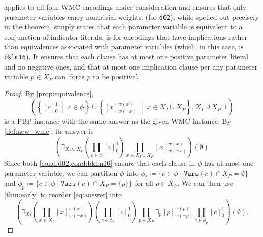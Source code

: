 \documentclass[runningheads]{llncs}
\begin{document}
 applies to all four WMC encodings under consideration and
ensures that only parameter variables carry nontrivial weights. 
(for \texttt{d02}), while spelled out precisely in the theorem, simply states
that each parameter variable is equivalent to a conjunction of indicator
literals.  is for encodings that have implications rather than
equivalences associated with parameter variables (which, in this case, is
\texttt{bklm16}). It ensures that each clause has at most one positive
parameter literal and no negative ones, and that at most one implication clause
per any parameter variable $p \in X_P$ can `force $p$ to be positive'.

\begin{proof}
  By \cref{prop:equivalence},
  \begin{equation}
    \left(\left\{[c]_0^1 \;\middle|\; c \in \phi\right\} \cup \left\{[x]_{w(\neg
          x)}^{w(x)} \;\middle|\; x \in X_I \cup X_P\right\}, X_I \cup X_P,
      1\right) \label{eq:new_wmc2}
  \end{equation}
  is a PBP instance with the same answer as the given WMC instance. By
  \cref{def:new_wmc}, its answer is
  \begin{equation} \label{eq:answer}
    \left(\exists_{X_I \cup X_P} \left( \prod_{c \in \phi} [c]_0^1 \right) \prod_{x \in X_I \cup X_P} [x]_{w(\neg x)}^{w(x)} \right)(\emptyset)
  \end{equation}
  Since both \cref{cond:d02,cond:bklm16} ensure that each clause in
  $\phi$ has at most one parameter variable, we can partition $\phi$ into
  $\phi_* \coloneqq \{c \in \phi \mid \mathtt{Vars}(c) \cap X_P = \emptyset \}$
  and $\phi_p \coloneqq \{ c \in \phi \mid \mathtt{Vars}(c) \cap X_P = \{ p \}
  \}$ for all $p \in X_P$. We can then use \cref{thm:early} to reorder
  \eqref{eq:answer} into
  \[
    \left(\exists_{X_I} \left( \prod_{x \in X_I} [x]_{w(\neg x)}^{w(x)} \right)
      \left( \prod_{c \in \phi_*} [c]_0^1 \right) \prod_{p \in X_P} \exists_p
      [p]_{w(\neg p)}^{w(p)} \prod_{c \in \phi_p} [c]_0^1 \right)(\emptyset).
  \]


\end{proof}
\end{document}
